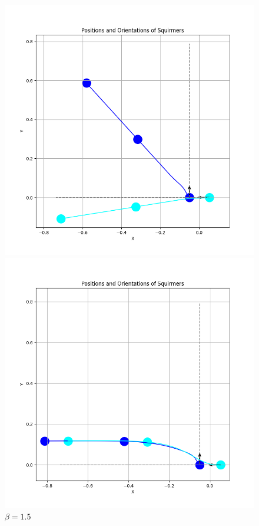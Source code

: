 \documentclass{article}
\begin{document}
\begin{figure}
\begin{minipage}{0.49\textwidth}
        \caption{\footnotesize $\beta = -3$}
    \end{minipage}
    \begin{minipage}{0.49\textwidth}
        \includegraphics[width=1.1\textwidth]{graphs/simulations/sim_sq_sq/beta1_5/pi_.png}
        \caption{\footnotesize $\beta = 1.5$}
    \end{minipage}\hfill
    \begin{minipage}{0.49\textwidth}
        \includegraphics[width=1.1\textwidth]{graphs/simulations/sim_sq_sq/beta3/pi_.png}

\end{minipage}
\end{figure}
\end{document}
